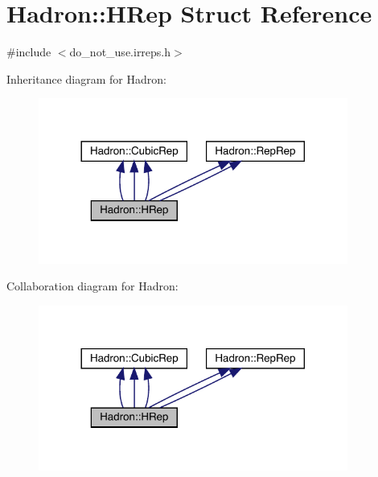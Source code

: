 \hypertarget{structHadron_1_1HRep}{}\section{Hadron\+:\+:H\+Rep Struct Reference}
\label{structHadron_1_1HRep}


{\ttfamily \#include $<$do\+\_\+not\+\_\+use.\+irreps.\+h$>$}



Inheritance diagram for Hadron\+:
\nopagebreak
\begin{figure}[H]
\begin{center}
\leavevmode
\includegraphics[width=288pt]{d3/d7f/structHadron_1_1HRep__inherit__graph}
\end{center}
\end{figure}


Collaboration diagram for Hadron\+:
\nopagebreak
\begin{figure}[H]
\begin{center}
\leavevmode
\includegraphics[width=288pt]{df/d21/structHadron_1_1HRep__coll__graph}
\end{center}
\end{figure}
